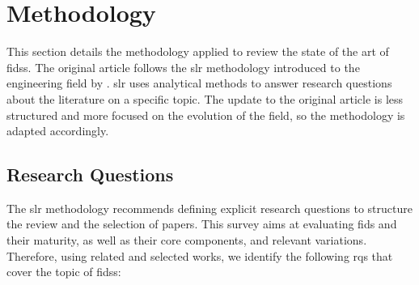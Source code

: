\section{Methodology\label{sec:sota.methodo}}

This section details the methodology applied to review the state of the art of \glspl{fids}.
The original article follows the \gls{slr} methodology introduced to the engineering field by \textcite{kitchenham_Guidelinesperformingsystematic_2007}.
\Gls{slr} uses analytical methods to answer research questions about the literature on a specific topic.
The update to the original article is less structured and more focused on the evolution of the field, so the methodology is adapted accordingly.


\subsection{Research Questions\label{sec:sota.methodo.questions}}

The \gls{slr} methodology recommends defining explicit research questions to structure the review
and the selection of papers.
This survey aims at evaluating \gls{fids} and their maturity, as well
as their core components, and relevant variations.
Therefore, using related and selected works, we identify the following \glspl{rq} that cover the topic of \glspl{fids}:



